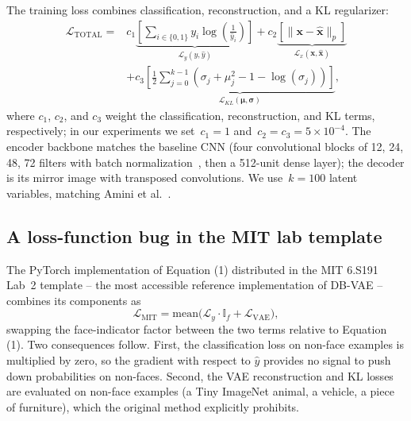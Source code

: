 \documentclass[10pt,twocolumn]{article}
\begin{document}
The training loss combines classification, reconstruction, and a KL
regularizer:
\begin{equation}
\begin{aligned}
    \mathcal{L}_{\text{TOTAL}} = {} & c_1 \underbrace{\left[ \sum_{i \in \{0, 1\}} y_i \log \left( \frac{1}{\hat{y}_i} \right) \right]}_{\mathcal{L}_y(y, \hat{y})} + c_2 \underbrace{\left[ \|\mathbf{x} - \hat{\mathbf{x}}\|_p \right]}_{\mathcal{L}_x(\mathbf{x}, \hat{\mathbf{x}})} \\
                                     & + c_3 \underbrace{\left[ \frac{1}{2} \sum_{j=0}^{k-1} \left( \sigma_j + \mu_j^2 - 1 - \log(\sigma_j) \right) \right]}_{\mathcal{L}_{KL}(\boldsymbol{\mu}, \boldsymbol{\sigma})},
    \label{eq:loss}
\end{aligned}
\end{equation}
where $c_1$, $c_2$, and $c_3$ weight the classification, reconstruction, and KL terms, respectively; in our experiments we set~$c_1 = 1$ and~$c_2 = c_3 = 5 \times 10^{-4}$. The encoder backbone matches the
baseline CNN (four convolutional blocks of 12, 24, 48, 72 filters with
batch normalization~\cite{ioffe2015batchnorm}, then a 512-unit dense layer);
the decoder is its mirror image with transposed convolutions. We
use~$k = 100$ latent variables, matching Amini et al.~\cite{amini2019dbvae}.

\subsection{A loss-function bug in the MIT lab template}
\label{sec:bug}

The PyTorch implementation of Equation (1) distributed in the MIT
6.S191 Lab~2 template -- the most accessible reference implementation of
DB-VAE -- combines its components as
\begin{equation}
    \mathcal{L}_{\text{MIT}} = \mathrm{mean}\bigl(\mathcal{L}_y \cdot \mathbb{I}_f + \mathcal{L}_{\text{VAE}}\bigr),
    \label{eq:buggy}
\end{equation}
swapping the face-indicator factor between the two terms relative to
Equation (1). Two consequences follow. First, the classification loss
on non-face examples is multiplied by zero, so the gradient with respect to
$\hat{y}$ provides no signal to push down probabilities on non-faces.
Second, the VAE reconstruction and KL losses are evaluated on non-face
examples (a Tiny ImageNet animal, a vehicle, a piece of furniture), which
the original method explicitly prohibits.
\end{document}
